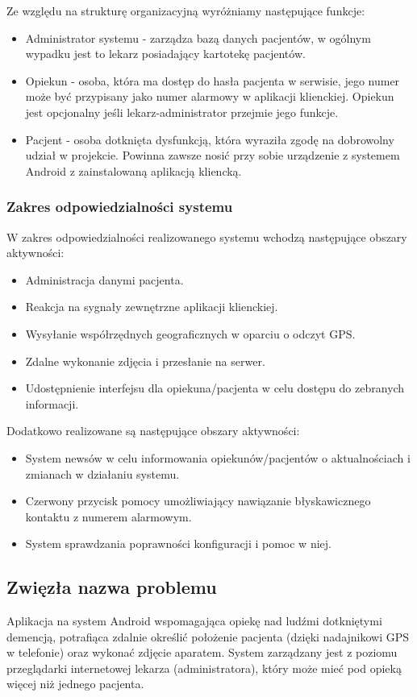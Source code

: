 \documentclass[11pt,a4paper]{article}
\begin{document}
Ze względu na strukturę organizacyjną wyróżniamy następujące funkcje:
\begin{itemize}
\item Administrator systemu - zarządza bazą danych pacjentów, w ogólnym wypadku jest to lekarz posiadający kartotekę pacjentów.
\item Opiekun - osoba, która ma dostęp do hasła pacjenta w serwisie, jego numer może być przypisany jako numer alarmowy w aplikacji klienckiej. Opiekun jest opcjonalny jeśli lekarz-administrator przejmie jego funkcje.
\item Pacjent - osoba dotknięta dysfunkcją, która wyraziła zgodę na dobrowolny udział w projekcie. Powinna zawsze nosić przy sobie urządzenie z systemem Android z zainstalowaną aplikacją kliencką.
\end{itemize}
\subsubsection {Zakres odpowiedzialności systemu}
W zakres odpowiedzialności realizowanego systemu wchodzą następujące obszary aktywności:
\begin{itemize}
\item Administracja danymi pacjenta.
\item Reakcja na sygnały zewnętrzne aplikacji klienckiej.
\item Wysyłanie współrzędnych geograficznych w oparciu o odczyt GPS.
\item Zdalne wykonanie zdjęcia i przesłanie na serwer.
\item Udostępnienie interfejsu dla opiekuna/pacjenta w celu dostępu do zebranych informacji.
\end{itemize}
Dodatkowo realizowane są następujące obszary aktywności:
\begin{itemize}
\item System newsów w celu informowania opiekunów/pacjentów o aktualnościach i zmianach w działaniu systemu.
\item Czerwony przycisk pomocy umożliwiający nawiązanie błyskawicznego kontaktu z numerem alarmowym.
\item System sprawdzania poprawności konfiguracji i pomoc w niej.
\end{itemize}


\subsection {Zwięzła nazwa problemu}
Aplikacja na system Android wspomagająca opiekę nad ludźmi dotkniętymi demencją, potrafiąca zdalnie określić położenie pacjenta (dzięki nadajnikowi GPS w telefonie) oraz wykonać zdjęcie aparatem. System zarządzany jest z poziomu przeglądarki internetowej lekarza (administratora), który może mieć pod opieką więcej niż jednego pacjenta.
\end{document}
